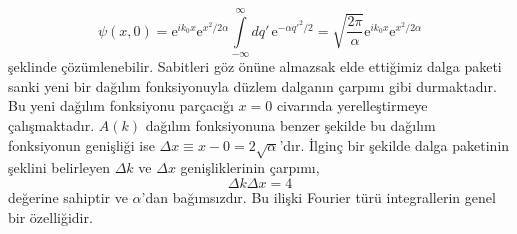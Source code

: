 \documentclass[a4paper,12pt, twoside]{article}
\begin{document}
\begin{equation}
\psi(x, 0) = \text{e}^{ik_0x} \text{e}^{x^2/2\alpha} \int\limits_{-\infty}^{\infty}dq' \, \text{e}^{-\alpha q'^2/2} = \sqrt{\frac{2\pi}{\alpha}} \text{e}^{ik_0x} \text{e}^{x^2/2\alpha}
\label{eq:wave_packet_t0}
\end{equation}
şeklinde çözümlenebilir. Sabitleri göz önüne almazsak elde ettiğimiz dalga paketi sanki yeni bir dağılım fonksiyonuyla düzlem dalganın çarpımı gibi durmaktadır. Bu yeni dağılım fonksiyonu parçacığı $x=0$ civarında yerelleştirmeye çalışmaktadır. $A(k)$ dağılım fonksiyonuna benzer şekilde bu dağılım fonksiyonun genişliği ise $\Delta x \equiv  x - 0 = 2\sqrt{\alpha}$'dır. İlginç bir şekilde dalga paketinin şeklini belirleyen $\Delta k$ ve $\Delta x$ genişliklerinin çarpımı,
\begin{equation}
\Delta k  \Delta x  = 4
\label{eq:del_x_k}
\end{equation}
değerine sahiptir ve $\alpha$'dan bağımsızdır. Bu ilişki Fourier türü integrallerin genel bir özelliğidir.
\end{document}
